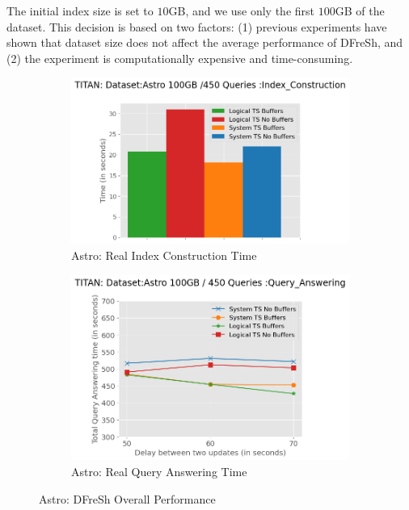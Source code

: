 The initial index size is set to $10$GB, and we use only the first $100$GB
of the dataset. This decision is based on two factors: (1) previous experiments
have shown that dataset size does not affect the average performance of DFreSh,
and (2) the experiment is computationally expensive and time-consuming.


\begin{figure}
	\centering
	\begin{subfigure}[c]{0.45\textwidth}
		\includegraphics[width=1\textwidth]   {figures/Experiments/Dynamic/ASTRO/index_construction_astro.png}
		\caption{Astro: Real Index Construction Time }
		\label{fig:actual-index-Construction-time-astro}
	\end{subfigure}
	\begin{subfigure}[c]{0.45\textwidth}
		\includegraphics[width=1\textwidth]	 {figures/Experiments/Dynamic/ASTRO/astro_query_answering_xaxis.png}
		\caption{Astro: Real Query Answering Time}
		\label{fig:actual-query-answering-time-astro}
	\end{subfigure}
	\caption{Astro: DFreSh Overall Performance}
	\label{fig:dfresh-performance-astro}
\end{figure}

